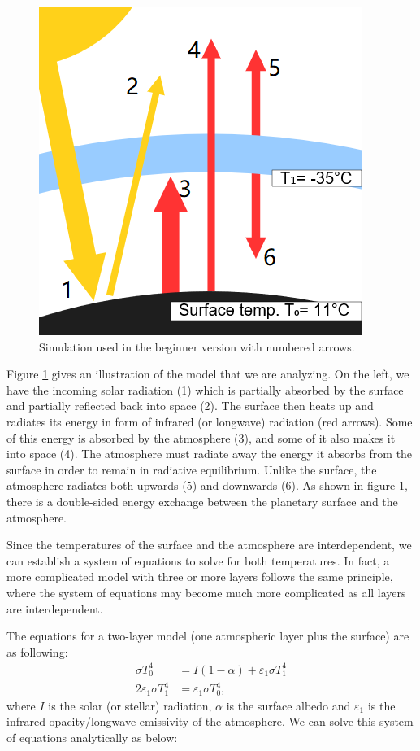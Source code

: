 \documentclass[a4paper,12pt]{article}
\begin{document}
\begin{figure}[H]
    \centering
    \includegraphics[scale=0.7]{simplemodel.PNG}
    \caption{Simulation used in the beginner version with numbered arrows.}
    \label{fig:simple}
\end{figure}

Figure \ref{fig:simple} gives an illustration of the model that we are analyzing. On the left, we have the incoming solar radiation (1) which is partially absorbed by the surface and partially reflected back into space (2). The surface then heats up and radiates its energy in form of infrared (or longwave) radiation (red arrows). Some of this energy is absorbed by the atmosphere (3), and some of it also makes it into space (4). The atmosphere must radiate away the energy it absorbs from the surface in order to remain in radiative equilibrium. Unlike the surface, the atmosphere radiates both upwards (5) and downwards (6). As shown in figure \ref{fig:simple}, there is a double-sided energy exchange between the planetary surface and the atmosphere. 

Since the temperatures of the surface and the atmosphere are interdependent, we can establish a system of equations to solve for both temperatures. In fact, a more complicated model with three or more layers follows the same principle, where the system of equations may become much more complicated as all layers are interdependent.

The equations for a two-layer model (one atmospheric layer plus the surface) are as following:
\begin{align}
    \sigma T_0^4 & = I(1-\alpha)+\varepsilon_1\sigma T_1^4 \label{eq:t0}\\
    2\varepsilon_1\sigma T_1^4 &= \varepsilon_1\sigma T_0^4,\label{eq:t1} 
\end{align}
where $I$ is the solar (or stellar) radiation, $\alpha$ is the surface albedo and $\varepsilon_1$ is the infrared opacity/longwave emissivity of the atmosphere. We can solve this system of equations analytically as below:
\end{document}

